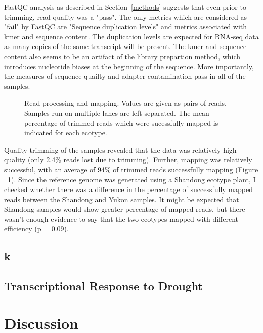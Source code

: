 \documentclass[12pt]{article}
\begin{document}
	FastQC analysis as described in Section~\ref{methods} suggests that even prior to trimming, read quality was a "pass". The only metrics which are considered as "fail" by FastQC are "Sequence duplication levels" and metrics associated with kmer and sequence content. The duplication levels are expected for RNA-seq data as many copies of the same transcript will be present. The kmer and sequence content also seems to be an artifact of the library prepartion method, which introduces nucleotide biases at the beginning of the sequence. More importantly, the  measures of sequence quailty and adapter contamination pass in all of the samples.
	
		\begin{figure}[H]
			\centering
			\scalebox{0.7}{}
			\caption[Read Processing Statistics]{Read processing and mapping. Values are given as pairs of reads. Samples run on multiple lanes are left separated. The mean percentage of trimmed reads which were sucessfully mapped is indicated for each ecotype.}
			\label{read_stats}
		\end{figure}
	
	Quality trimming of the samples revealed that the data was relatively high quality (only 2.4\% reads lost due to trimming). Further, mapping was relatively successful, with an average of 94\% of trimmed reads successfully mapping (Figure ~\ref{read_stats}). Since the reference genome was generated using a Shandong ecotype plant, I checked whether there was a difference in the percentage of successfully mapped reads between the Shandong and Yukon samples. It might be expected that Shandong samples would show greater percentage of mapped reads, but there wasn't enough evidence to say that the two ecotypes mapped with different efficiency (p = 0.09). 
	\subsection{k}
	\subsection{Transcriptional Response to Drought}
	\section{Discussion}
\clearpage


\end{document}
